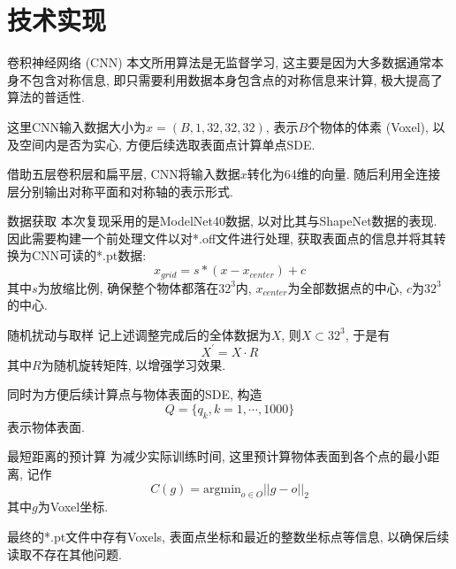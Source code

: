 \documentclass[UTF8, aspectratio=169, 11pt]{ctexbeamer}
\begin{document}
    \section{技术实现}
    \begin{frame}{卷积神经网络 (CNN)}
        本文所用算法是无监督学习, 这主要是因为大多数据通常本身不包含对称信息, 即只需要利用数据本身包含点的对称信息来计算, 极大提高了算法的普适性.
        
        这里CNN输入数据大小为$x=(B, 1, 32, 32, 32)$, 表示$B$个物体的体素 (Voxel), 以及空间内是否为实心, 方便后续选取表面点计算单点SDE.

        借助五层卷积层和扁平层, CNN将输入数据$x$转化为64维的向量. 随后利用全连接层分别输出对称平面和对称轴的表示形式.
    \end{frame}
    \begin{frame}{数据获取}
        本次复现采用的是ModelNet40数据, 以对比其与ShapeNet数据的表现. 因此需要构建一个前处理文件以对*.off文件进行处理, 获取表面点的信息并将其转换为CNN可读的*.pt数据:
        \begin{equation}
            x_{grid} = s * (x - x_{center}) + c
        \end{equation}
        其中$s$为放缩比例, 确保整个物体都落在$32^3$内, $x_{center}$为全部数据点的中心, $c$为$32^3$的中心.
    \end{frame}
    \begin{frame}{随机扰动与取样}
        记上述调整完成后的全体数据为$X$, 则$X\subset 32^3$, 于是有
        \begin{equation}
            X^{\prime} = X\cdot R
        \end{equation}
        其中$R$为随机旋转矩阵, 以增强学习效果.
        
        同时为方便后续计算点与物体表面的SDE, 构造
        \begin{equation}
            Q = \{q_k, k=1,\cdots, 1000\}
        \end{equation}
        表示物体表面.
    \end{frame}
    \begin{frame}{最短距离的预计算}
        为减少实际训练时间, 这里预计算物体表面到各个点的最小距离, 记作
        \begin{equation}
            C(g) = \text{argmin}_{o \in O} ||g - o||_2
        \end{equation}
        其中$g$为Voxel坐标.

        最终的*.pt文件中存有Voxels, 表面点坐标和最近的整数坐标点等信息, 以确保后续读取不存在其他问题.
    \end{frame}
\end{document}
